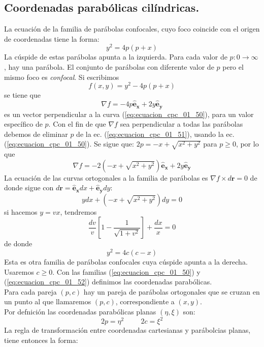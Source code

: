 \subsection*{Coordenadas parabólicas cilíndricas.}
La ecuación de la familia de parábolas confocales, cuyo foco coincide con el origen de coordenadas tiene la forma:
\begin{equation}
y^{2} = 4 p (p + x)
\label{eq:ecuacion_cpc_01_50}
\end{equation}
La cúspide de estas parábolas apunta a la izquierda. Para cada valor de $p: 0 \to \infty$, hay una parábola. El conjunto de parábolas con diferente valor de $p$ pero el mismo foco es \emph{confocal}. Si escribimos
\[ f(x,y) = y^{2} - 4p(p+x) \]
se tiene que
\begin{equation}
\nabla f = - 4 p \mathbf{\widehat{e}_{x}} + 2 y \mathbf{\widehat{e}_{y}}
\label{eq:ecuacion_cpc_01_51}
\end{equation}
es un vector perpendicular a la curva (\ref{eq:ecuacion_cpc_01_50}), para un valor específico de $p$. Con el fin de que $\nabla f$ sea perpendicular a todas las parábolas debemos de eliminar $p$ de la ec. (\ref{eq:ecuacion_cpc_01_51}), usando la ec. (\ref{eq:ecuacion_cpc_01_50}). Se sigue que: $2p = -x + \sqrt{x^{2} + y^{2}}$ para $p \geq 0$, por lo que
\[  \nabla f =  -2 \left( -x + \sqrt{x^{2} + y^{2}} \right) \mathbf{\widehat{e}_{x}} + 2 y \mathbf{\widehat{e}_{y}}  \]
La ecuación de las curvas ortogonales a la familia de parábolas es $\nabla f \times d \mathbf{r} = 0$ de donde sigue con $d \mathbf{r} = \mathbf{\widehat{e}_{x}} dx + \mathbf{\widehat{e}_{y}} dy$:
\[ y dx +  \left( - x + \sqrt{x^{2} + y^{2}} \right) dy = 0 \]
si hacemos $y = vx$, tendremos
\[ \dfrac{dv}{v} \left[ 1 - \dfrac{1}{\sqrt{1 + v^{2}}} \right] + \dfrac{dx}{x} = 0 \]
de donde
\begin{equation}
 y^{2} = 4c (c -x)
 \label{eq:ecuacion_cpc_01_52}
\end{equation}
Esta es otra familia de parábolas confocales cuya cúspide apunta a la derecha. Usaremos $c \geq 0$. Con las familias (\ref{eq:ecuacion_cpc_01_50}) y (\ref{eq:ecuacion_cpc_01_52}) definimos las coordenadas parabólicas.
\\
Para cada pareja $(p, c)$ hay un pareja de parábolas ortogonales que se cruzan en un punto al que llamaremos $(p, c)$, correspondiente a $(x, y)$.
\\
Por defnición las coordenadas parabólicas planas $(\eta, \xi)$ son:
\[ 2p = \eta^{2} \hspace{1cm} 2c = \xi^{2} \]
La regla de transformación entre coordenadas cartesianas y parábolcias planas, tiene entonces la forma:

